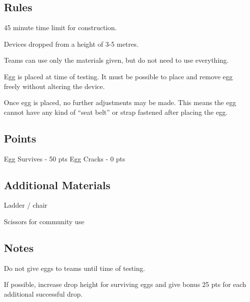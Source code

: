 \subsection{Rules}
\begin{itemize*}
\item 45 minute time limit for construction.
\item Devices dropped from a height of 3-5 metres.
\item Teams can use only the materials given, but do not need to use everything.
\item Egg is placed at time of testing.  It must be possible to place and remove egg freely without altering the device.
\item Once egg is placed, no further adjustments may be made. This means the egg cannot have any kind of ``seat belt'' or strap fastened after placing the egg.
\end{itemize*}

\subsection{Points}
Egg Survives - 50 pts \quad Egg Cracks - 0 pts

\subsection{Additional Materials}
\begin{itemize*}
\item Ladder / chair
\item Scissors for community use
\end{itemize*}

\subsection{Notes}
\begin{itemize*}
\item Do not give eggs to teams until time of testing.
\item If possible, increase drop height for surviving eggs and give bonus 25 pts for each additional successful drop.
\end{itemize*}


